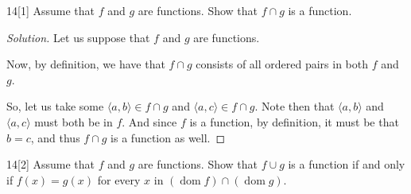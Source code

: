 \documentclass{article}
\newenvironment{solution}{\begin{proof}[Solution]}{\end{proof}}
\DeclareMathOperator*{\dom}{\mathrm{dom}}
\newcommand{\ang}[1]{\langle {#1} \rangle}
\begin{document}
	\begin{hw}{14}[1]
		Assume that $f$ and $g$ are functions. Show that $f \cap g$ is a function.
	\end{hw}
	\begin{solution}
		Let us suppose that $f$ and $g$ are functions.
		
		Now, by definition, we have that $f \cap g$ consists of all ordered pairs in both $f$ and $g$.
		
		So, let us take some $\ang{a,b} \in f \cap g$ and $\ang{a,c} \in f \cap g$. Note then that $\ang{a,b}$ and $\ang{a,c}$ must both be in $f$. And since $f$ is a function, by definition, it must be that $b = c$, and thus $f \cap g$ is a function as well.
	\end{solution}
	
	\begin{hw}{14}[2]
		Assume that $f$ and $g$ are functions. Show that $f \cup g$ is a function if and only if $f(x) = g(x)$ for every $x$ in $(\dom f) \cap (\dom g)$.
	\end{hw}
\end{document}
